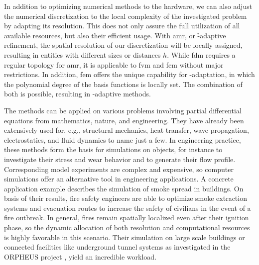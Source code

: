 In addition to optimizing numerical methods to the hardware, we can also adjust the numerical discretization to the local complexity of the investigated problem by adapting its resolution.
This does not only assure the full utilization of all available resources, but also their efficient usage.
With \gls{amr}, or \h-adaptive refinement, the spatial resolution of our discretization will be locally assigned, resulting in entities with different sizes or distances $h$. While \gls{fdm} requires a regular topology for \gls{amr}, it is applicable to \gls{fvm} and \gls{fem} without major restrictions. In addition, \gls{fem} offers the unique capability for \p-adaptation, in which the polynomial degree of the basis functions is locally set. The combination of both is possible, resulting in \hp-adaptive methods.


The methods can be applied on various problems involving partial differential equations from mathematics, nature, and engineering. They have already been extensively used for, e.g., structural mechanics, heat transfer, wave propagation, electrostatics, and fluid dynamics to name just a few.
In engineering practice, these methods form the basis for simulations on objects, for instance to investigate their stress and wear behavior and to generate their flow profile. Corresponding model experiments are complex and expensive, so computer simulations offer an alternative tool in engineering applications.
A concrete application example describes the simulation of smoke spread in buildings.
On basis of their results, fire safety engineers are able to optimize smoke extraction systems and evacuation routes to increase the safety of civilians in the event of a fire outbreak.
In general, fires remain spatially localized even after their ignition phase, so the dynamic allocation of both resolution and computational resources is highly favorable in this scenario.
Their simulation on large scale buildings or connected facilities like underground tunnel systems as investigated in the ORPHEUS project \parencite{arnold2017}, yield an incredible workload.

